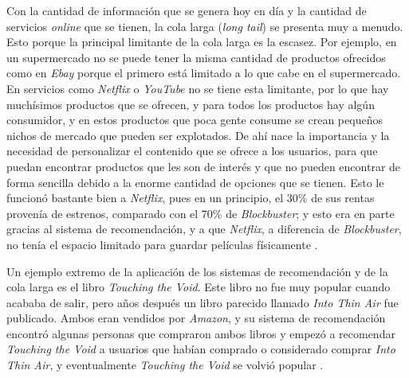 Con la cantidad de información que se genera hoy en día y la cantidad de servicios \textit{online} que se tienen, la cola larga (\textit{long tail}) se presenta muy a menudo. Esto porque la principal limitante de la cola larga es la escasez. Por ejemplo, en un supermercado no se puede tener la misma cantidad de productos ofrecidos como en \textit{Ebay} porque el primero está limitado a lo que cabe en el supermercado. En servicios como \textit{Netflix} o \textit{YouTube} no se tiene esta limitante, por lo que hay muchísimos productos que se ofrecen, y para todos los productos hay algún consumidor, y en estos productos que poca gente consume se crean pequeños nichos de mercado que pueden ser explotados. De ahí nace la importancia y la necesidad de personalizar el contenido que se ofrece a los usuarios, para que puedan encontrar productos que les son de interés y que no pueden encontrar de forma sencilla debido a la enorme cantidad de opciones que se tienen. Esto le funcionó bastante bien a \textit{Netflix}, pues en un principio, el 30\% de sus rentas provenía de estrenos, comparado con el 70\% de \textit{Blockbuster}; y esto era en parte gracias al sistema de recomendación, y a que \textit{Netflix}, a diferencia de \textit{Blockbuster}, no tenía el espacio limitado para guardar películas físicamente \cite{bloombergnetflixsales}.


Un ejemplo extremo de la aplicación de los sistemas de recomendación y de la cola larga es el libro \textit{Touching the Void}. Este libro no fue muy popular cuando acababa de salir, pero años después un libro parecido llamado \textit{Into Thin Air} fue publicado. Ambos eran vendidos por \textit{Amazon}, y su sistema de recomendación encontró algunas personas que compraron ambos libros y empezó a recomendar \textit{Touching the Void} a usuarios que habían comprado o considerado comprar \textit{Into Thin Air}, y eventualmente \textit{Touching the Void} se volvió popular \cite{leskovec_mining_2014}.


